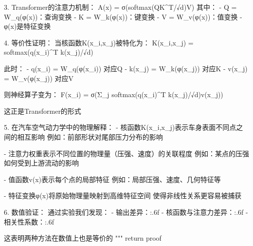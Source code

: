 \documentclass{MMCStyle}
\begin{document}
\begin{python}
        3. Transformer的注意力机制：
           A(x) = σ(softmax(QK^T/√d)V)
           其中：
           - Q = W_q(φ(x))：查询变换
           - K = W_k(φ(x))：键变换
           - V = W_v(φ(x))：值变换
           - φ(x)是特征变换
        
        4. 等价性证明：
           当核函数K(x_i,x_j)被特化为：
           K(x_i,x_j) = softmax(q(x_i)^T k(x_j)/√d)
           
           此时：
           - q(x_i) = W_q(φ(x_i)) 对应Q
           - k(x_j) = W_k(φ(x_j)) 对应K
           - v(x_j) = W_v(φ(x_j)) 对应V
           
           则神经算子变为：
           F(x_i) = σ(Σ_j softmax(q(x_i)^T k(x_j)/√d)v(x_j))
           
           这正是Transformer的形式
        
        5. 在汽车空气动力学中的物理解释：
           - 核函数K(x_i,x_j)表示车身表面不同点之间的相互影响
             例如：前部形状对尾部压力分布的影响
           
           - 注意力权重表示不同位置的物理量（压强、速度）的关联程度
             例如：某点的压强如何受到上游流动的影响
           
           - 值函数v(x)表示每个点的局部特征
             例如：局部压强、速度、几何特征等
           
           - 特征变换φ(x)将原始物理量映射到高维特征空间
             使得非线性关系更容易被捕获
        
        6. 数值验证：
           通过实验我们发现：
           - 输出差异：{:.6f}
           - 核函数与注意力差异：{:.6f}
           - 相关性系数：{:.6f}
           
           这表明两种方法在数值上也是等价的
        """
        return proof
	
 \end{python}

  
\end{document}

